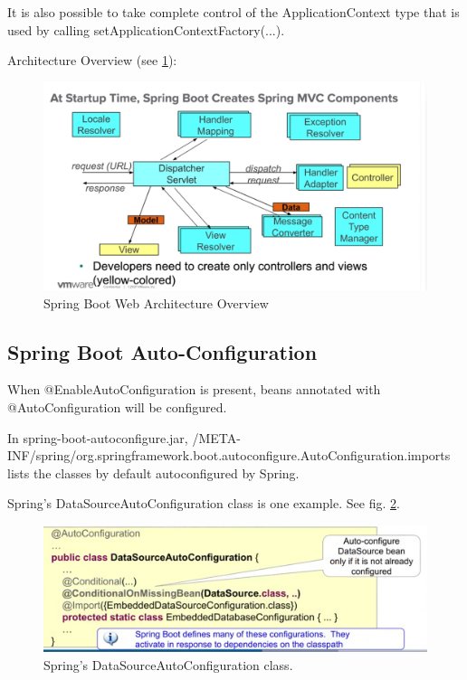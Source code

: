 \documentclass{scrartcl}
\begin{document}
It is also possible to take complete control of the ApplicationContext type that is used by calling setApplicationContextFactory(...).


Architecture Overview (see \ref{fig:spring-web}):

\begin{figure}[h]
    \centering
    \includegraphics[width=1\linewidth]{spring-web}
    \caption{Spring Boot Web Architecture Overview}
    \label{fig:spring-web}
\end{figure}

\subsection{Spring Boot Auto-Configuration}

When @EnableAutoConfiguration is present, beans annotated with @AutoConfiguration  will be configured.

In spring-boot-autoconfigure.jar, /META-INF/spring/org.springframework.boot.autoconfigure.AutoConfiguration.imports lists the classes by default autoconfigured by Spring.

Spring's DataSourceAutoConfiguration class is one example. See fig. \ref{fig:datasourceautoconfiguration}.

\begin{figure}
    \centering
    \includegraphics[width=1\linewidth]{datasourceautoconfiguration}
    \caption{Spring's DataSourceAutoConfiguration class.}
    \label{fig:datasourceautoconfiguration}
\end{figure}
\end{document}
